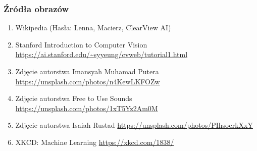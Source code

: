 \documentclass{beamer}
\begin{document}
            \begin{frame}
                \frametitle{Źródła obrazów}
                \begin{enumerate}
                    \item Wikipedia (Hasła: Lenna, Macierz, ClearView AI)
                    \item Stanford Introduction to Computer Vision
                        \url{https://ai.stanford.edu/~syyeung/cvweb/tutorial1.html}
                    \item Zdjęcie autorstwa Imansyah Muhamad Putera
                        \url{https://unsplash.com/photos/n4KewLKFOZw}
                    \item Zdjęcie autorstwa Free to Use Sounds
                        \url{https://unsplash.com/photos/1xT5Yz2Am0M}
                    \item Zdjęcie autorstwa Isaiah Rustad
                        \url{https://unsplash.com/photos/PIhsoerkXxY}
                    \item XKCD: Machine Learning
                        \url{https://xkcd.com/1838/}
                \end{enumerate}
            \end{frame}
\end{document}
